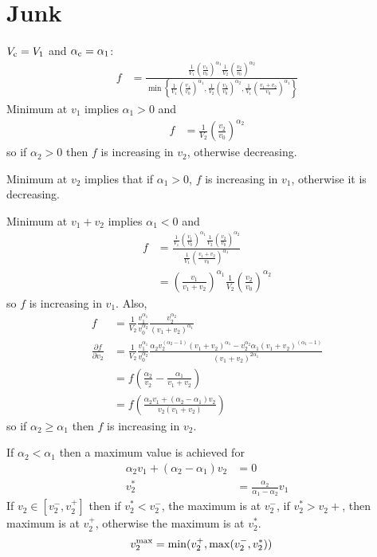 \documentclass{article}
\begin{document}
\section{Junk}

$V_{\rm c} = V_1$ and $\alpha_{\rm c} = \alpha_1$:
\begin{align}
  f &= \frac{\frac{1}{V_1} \left(\frac{v_1}{v_0}\right)^{\alpha_1}
    \frac{1}{V_2} \left(\frac{v_2}{v_0}\right)^{\alpha_2}}{
    \min\left\{ \frac{1}{V_1} \left(\frac{v_1}{v_0}\right)^{\alpha_1},
        \frac{1}{V_2} \left(\frac{v_2}{v_0}\right)^{\alpha_2},
        \frac{1}{V_1} \left(\frac{v_1 + v_2}{v_0}\right)^{\alpha_1} \right\}}
\end{align}
Minimum at $v_1$ implies $\alpha_1 > 0$ and
\begin{align}
  f &= \frac{1}{V_2} \left(\frac{v_2}{v_0}\right)^{\alpha_2}
\end{align}
so if $\alpha_2 > 0$ then $f$ is increasing in $v_2$, otherwise
decreasing.

Minimum at $v_2$ implies that if $\alpha_1 > 0$, $f$ is increasing in
$v_1$, otherwise it is decreasing.

Minimum at $v_1 + v_2$ implies $\alpha_1 < 0$ and
\begin{align}
  f &= \frac{\frac{1}{V_1} \left(\frac{v_1}{v_0}\right)^{\alpha_1}
    \frac{1}{V_2} \left(\frac{v_2}{v_0}\right)^{\alpha_2}}{
    \frac{1}{V_1} \left(\frac{v_1 + v_2}{v_0}\right)^{\alpha_1}} \\
  &= \left(\frac{v_1}{v_1 + v_2}\right)^{\alpha_1}
  \frac{1}{V_2} \left(\frac{v_2}{v_0}\right)^{\alpha_2}
\end{align}
so $f$ is increasing in $v_1$. Also,
\begin{align}
  f &= \frac{1}{V_2} \frac{v_1^{\alpha_1}}{v_0^{\alpha_2}}
  \frac{v_2^{\alpha_2}}{(v_1 + v_2)^{\alpha_1}} \\
  \frac{\partial f}{\partial v_2} &= \frac{1}{V_2}
  \frac{v_1^{\alpha_1}}{v_0^{\alpha_2}} \frac{\alpha_2
    v_2^{(\alpha_2-1)} (v_1+v_2)^{\alpha_1} - v_2^{\alpha_2} \alpha_1
    (v_1+v_2)^{(\alpha_1-1)}}{
    (v_1 + v_2)^{2\alpha_1}} \\
  &= f \left(\frac{\alpha_2}{v_2} - \frac{\alpha_1}{v_1+v_2}\right) \\
  &= f \left(\frac{\alpha_2 v_1 + (\alpha_2 - \alpha_1) v_2}{v_2(v_1 +
      v_2)} \right)
\end{align}
so if $\alpha_2 \ge \alpha_1$ then $f$ is increasing in $v_2$.

If $\alpha_2 < \alpha_1$ then a maximum value is achieved for
\begin{align}
  \alpha_2 v_1 + (\alpha_2 - \alpha_1) v_2 &= 0 \\
  v_2^* &= \frac{\alpha_2}{\alpha_1 - \alpha_2} v_1
\end{align}
If $v_2 \in [v_2^-,v_2^+]$ then if $v_2^* < v_2^-$, the maximum is at
$v_2^-$, if $v_2^* > v_2+$, then maximum is at $v_2^+$, otherwise the
maximum is at $v_2^*$.
\begin{align}
  v_2^{\rm max} &= \min(v_2^+, \max(v_2^-, v_2^*))
\end{align}
\end{document}
